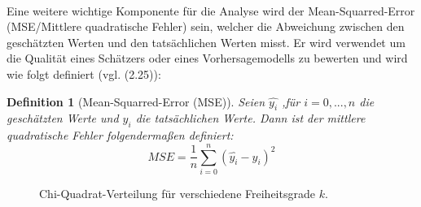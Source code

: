 \documentclass[%
thesis=student,%
coverpage=false,%
titlepage=false,%
headmarks=true, %
german,%
font=libertine, %
math=newpxtx, %
BCOR=5mm,%
coverBCOR=11mm%
]{tumbook}
\theoremstyle{break}
\newtheorem{definition}{Definition}[section]
\begin{document}
\\
Eine weitere wichtige Komponente für die Analyse wird der Mean-Squarred-Error (MSE/Mittlere quadratische Fehler) sein, welcher die Abweichung zwischen den geschätzten Werten und den tatsächlichen Werten misst. Er wird verwendet um die Qualität eines Schätzers oder eines Vorhersagemodells zu bewerten und wird wie folgt definiert (vgl. \cite{MSE} (2.25)):
\begin{definition}[Mean-Squarred-Error (MSE)]
	Seien $\hat{y_i}$ ,für  $i=0,...,n$ die geschätzten Werte und $y_i$ die tatsächlichen Werte. Dann ist der mittlere quadratische Fehler folgendermaßen definiert:
	$$ MSE = \frac{1}{n} \sum_{i = 0}^{n} (\hat{y_i}-y_i)^2$$
\end{definition}
\begin{figure}[h!]
	\centering
	\caption{Chi-Quadrat-Verteilung für verschiedene Freiheitsgrade $k$.}
	\label{fig:chi2}
\end{figure}


\end{document}
